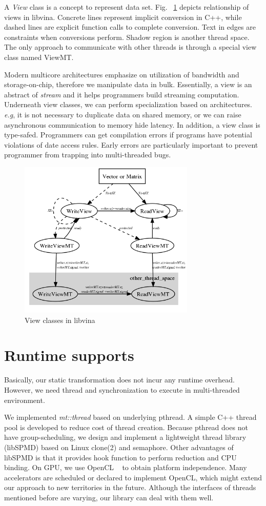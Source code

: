 A \emph{View} class is a concept to represent data set.
Fig. ~\ref{fig:view} depicts relationship of views in libvina. Concrete lines
represent implicit conversion in C++, while  dashed lines are explicit
function calls to complete conversion. Text in edges are constraints
when conversions perform. Shadow region is another thread space. The
only approach to communicate with other threads is through a special view
class named ViewMT.  

Modern multicore architectures emphasize on utilization of 
bandwidth and storage-on-chip, therefore we manipulate data in
bulk. Essentially, a view is an abstract of \emph{stream} and it
helps programmers build streaming computation. Underneath view
classes, we can perform specialization based on architectures. \textit{e.g}, it is not necessary to duplicate
data  on shared memory, or  we can raise asynchronous communication to memory
hide latency. In addition, a view class is type-safed. Programmers can get
compilation errors if programs have potential violations of date access rules. Early errors are particularly
important to prevent programmer from trapping into multi-threaded bugs.

\begin{figure}
\includegraphics[width=3.3in]{../view_concept}
\caption{View classes in libvina}
\label{fig:view}
\end{figure}
\section{Runtime supports}
Basically, our static transformation does not incur any runtime
overhead. However, we need thread and synchronization to execute in
multi-threaded environment.

We implemented \emph{mt::thread} based on underlying pthread. A
simple C++ thread pool is developed to reduce cost of thread
creation. Because pthread does not have group-scheduling, we design
and implement a lightweight thread library (libSPMD) based on Linux
clone(2) and semaphore. Other advantages of libSPMD
is that it provides hook function to perform reduction and CPU binding. 
On GPU, we use OpenCL ~\cite{opencl} to obtain platform
independence. Many accelerators are scheduled or declared to
implement OpenCL, which might extend our approach to new
territories in the future.  Although the interfaces of threads
mentioned before are varying, our library can deal with them well.

